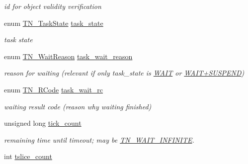 \begin{DoxyCompactItemize}
\begin{DoxyCompactList}\small\item\em id for object validity verification \end{DoxyCompactList}\item 
\hypertarget{structTN__Task_a6a1ec466a27d43d68f21a62e2c6cf03d}{enum \hyperlink{tn__tasks_8h_a5e12e8a0ab280b515f44bf3fee1210a6}{T\+N\+\_\+\+Task\+State} \hyperlink{structTN__Task_a6a1ec466a27d43d68f21a62e2c6cf03d}{task\+\_\+state}}\label{structTN__Task_a6a1ec466a27d43d68f21a62e2c6cf03d}

\begin{DoxyCompactList}\small\item\em task state \end{DoxyCompactList}\item 
\hypertarget{structTN__Task_a37d3c12db92b7dfc6c3bb661216f3c11}{enum \hyperlink{tn__tasks_8h_a343b0332013c15d6e878c2f60ed2c9b7}{T\+N\+\_\+\+Wait\+Reason} \hyperlink{structTN__Task_a37d3c12db92b7dfc6c3bb661216f3c11}{task\+\_\+wait\+\_\+reason}}\label{structTN__Task_a37d3c12db92b7dfc6c3bb661216f3c11}

\begin{DoxyCompactList}\small\item\em reason for waiting (relevant if only {\ttfamily task\+\_\+state} is \hyperlink{tn__tasks_8h_a5e12e8a0ab280b515f44bf3fee1210a6aaa3dfaf2bb5992e0cef981618ce30d56}{{\ttfamily W\+A\+I\+T}} or \hyperlink{tn__tasks_8h_a5e12e8a0ab280b515f44bf3fee1210a6ad010070ccc16a5c706c286baf2e3ee2a}{{\ttfamily W\+A\+I\+T+\+S\+U\+S\+P\+E\+N\+D}}) \end{DoxyCompactList}\item 
\hypertarget{structTN__Task_a367b92b74248f8702ed428a695079903}{enum \hyperlink{tn__common_8h_aa43bd3da1ad4c1e61224b5f23b369876}{T\+N\+\_\+\+R\+Code} \hyperlink{structTN__Task_a367b92b74248f8702ed428a695079903}{task\+\_\+wait\+\_\+rc}}\label{structTN__Task_a367b92b74248f8702ed428a695079903}

\begin{DoxyCompactList}\small\item\em waiting result code (reason why waiting finished) \end{DoxyCompactList}\item 
\hypertarget{structTN__Task_a004ce053de7b40cba76f07177b805977}{unsigned long \hyperlink{structTN__Task_a004ce053de7b40cba76f07177b805977}{tick\+\_\+count}}\label{structTN__Task_a004ce053de7b40cba76f07177b805977}

\begin{DoxyCompactList}\small\item\em remaining time until timeout; may be {\ttfamily \hyperlink{tn__arch__example_8h_a16909a2a05bc2bc628109d843208a76b}{T\+N\+\_\+\+W\+A\+I\+T\+\_\+\+I\+N\+F\+I\+N\+I\+T\+E}}. \end{DoxyCompactList}\item 
\hypertarget{structTN__Task_ab3ca332d577071de47d85fb1371f6830}{int \hyperlink{structTN__Task_ab3ca332d577071de47d85fb1371f6830}{tslice\+\_\+count}}\label{structTN__Task_ab3ca332d577071de47d85fb1371f6830}


\end{DoxyCompactItemize}
